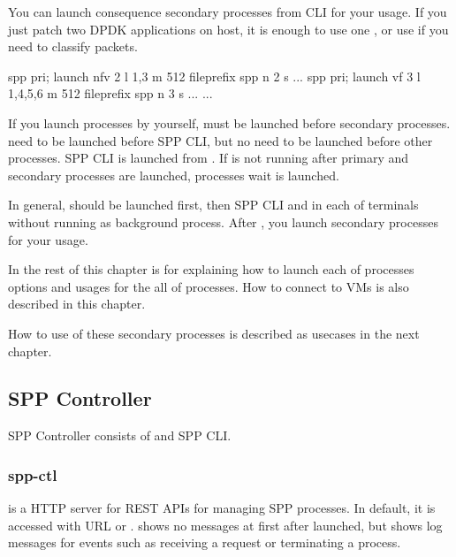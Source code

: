 \documentclass[a4paper,11pt,openany,oneside,english]{sphinxmanual}
\begin{document}
You can launch consequence secondary processes from CLI for your usage.
If you just patch two DPDK applications on host, it is enough to use one
, or use  if you need to classify packets.

\begin{sphinxVerbatim}[commandchars=\\\{\},formatcom=\footnotesize]
spp \PYGZgt{} pri; launch nfv 2 \PYGZhy{}l 1,3 \PYGZhy{}m 512 \PYGZhy{}\PYGZhy{}file\PYGZhy{}prefix spp \PYGZhy{}\PYGZhy{} \PYGZhy{}n 2 \PYGZhy{}s ...
spp \PYGZgt{} pri; launch vf 3 \PYGZhy{}l 1,4,5,6 \PYGZhy{}m 512 \PYGZhy{}\PYGZhy{}file\PYGZhy{}prefix spp \PYGZhy{}\PYGZhy{} \PYGZhy{}n 3 \PYGZhy{}s ...
...
\end{sphinxVerbatim}

If you launch processes by yourself,  must be launched
before secondary processes.
 need to be launched before SPP CLI, but no need to be launched
before other processes. SPP CLI is launched from .
If  is not running after primary and
secondary processes are launched, processes wait  is launched.

In general,  should be launched first, then SPP CLI and
 in each of terminals without running as background process.
After , you launch secondary processes for your usage.

In the rest of this chapter is for explaining how to launch each of processes
options and usages for the all of processes.
How to connect to VMs is also described in this chapter.

How to use of these secondary processes is described as usecases
in the next chapter.


\subsection{SPP Controller}
\label{\detokenize{gsg/howto_use:spp-controller}}\label{\detokenize{gsg/howto_use:spp-gsg-howto-controller}}
SPP Controller consists of  and SPP CLI.


\subsubsection{spp-ctl}
\label{\detokenize{gsg/howto_use:spp-ctl}}
 is a HTTP server for REST APIs for managing SPP
processes. In default, it is accessed with URL 
or .
 shows no messages at first after launched, but shows
log messages for events such as receiving a request or terminating
a process.
\end{document}
